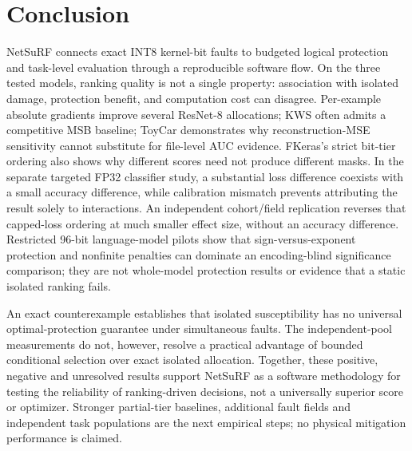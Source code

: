 \section{Conclusion}
NetSuRF connects exact INT8 kernel-bit faults to budgeted logical protection and
task-level evaluation through a reproducible software flow. On the three tested
models, ranking quality is not a single property: association with isolated
damage, protection benefit, and computation cost can disagree. Per-example
absolute gradients improve several ResNet-8 allocations; KWS often admits a
competitive MSB baseline; ToyCar demonstrates why reconstruction-MSE sensitivity
cannot substitute for file-level AUC evidence. FKeras's strict bit-tier ordering
also shows why different scores need not produce different masks.
In the separate targeted FP32 classifier study, a substantial loss difference
coexists with a small accuracy difference, while calibration mismatch prevents
attributing the result solely to interactions. An independent cohort/field
replication reverses that capped-loss ordering at much smaller effect size,
without an accuracy difference. Restricted 96-bit language-model pilots show
that sign-versus-exponent protection and nonfinite penalties can dominate an
encoding-blind significance comparison; they are not whole-model protection
results or evidence that a static isolated ranking fails.

An exact counterexample establishes that isolated susceptibility has no universal
optimal-protection guarantee under simultaneous faults. The independent-pool
measurements do not, however, resolve a practical advantage of bounded
conditional selection over exact isolated allocation. Together, these positive,
negative and unresolved results support NetSuRF as a software methodology for
testing the reliability of ranking-driven decisions, not a universally superior
score or optimizer. Stronger partial-tier baselines, additional fault fields and
independent task populations are the next empirical steps; no physical mitigation
performance is claimed.
